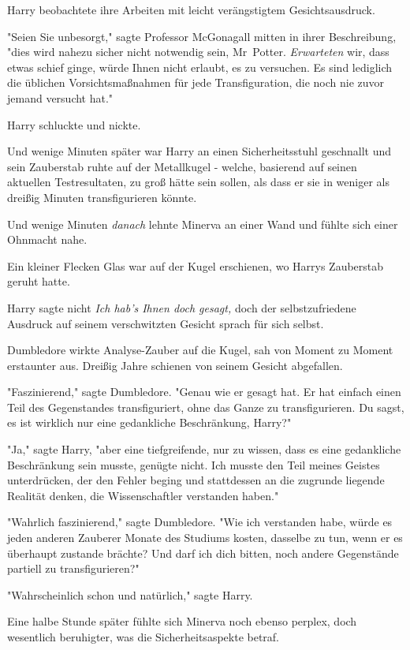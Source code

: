 {Harry beobachtete ihre Arbeiten mit leicht verängstigtem Gesichtsausdruck.

"Seien Sie unbesorgt," sagte Professor McGonagall mitten in ihrer Beschreibung, "dies wird nahezu sicher nicht notwendig sein, Mr~Potter. \emph{Erwarteten} wir, dass etwas schief ginge, würde Ihnen nicht erlaubt, es zu versuchen. Es sind lediglich die üblichen Vorsichtsmaßnahmen für jede Transfiguration, die noch nie zuvor jemand versucht hat."

Harry schluckte und nickte.

Und wenige Minuten später war Harry an einen Sicherheitsstuhl geschnallt und sein Zauberstab ruhte auf der Metallkugel - welche, basierend auf seinen aktuellen Testresultaten, zu groß hätte sein sollen, als dass er sie in weniger als dreißig Minuten transfigurieren könnte.

Und wenige Minuten \emph{danach} lehnte Minerva an einer Wand und fühlte sich einer Ohnmacht nahe.

Ein kleiner Flecken Glas war auf der Kugel erschienen, wo Harrys Zauberstab geruht hatte.

Harry sagte nicht \emph{Ich hab's Ihnen doch gesagt,} doch der selbstzufriedene Ausdruck auf seinem verschwitzten Gesicht sprach für sich selbst.

Dumbledore wirkte Analyse-Zauber auf die Kugel, sah von Moment zu Moment erstaunter aus. Dreißig Jahre schienen von seinem Gesicht abgefallen.

"Faszinierend," sagte Dumbledore. "Genau wie er gesagt hat. Er hat einfach einen Teil des Gegenstandes transfiguriert, ohne das Ganze zu transfigurieren. Du sagst, es ist wirklich nur eine gedankliche Beschränkung, Harry?"

"Ja," sagte Harry, "aber eine tiefgreifende, nur zu wissen, dass es eine gedankliche Beschränkung sein musste, genügte nicht. Ich musste den Teil meines Geistes unterdrücken, der den Fehler beging und stattdessen an die zugrunde liegende Realität denken, die Wissenschaftler verstanden haben."

"Wahrlich faszinierend," sagte Dumbledore. "Wie ich verstanden habe, würde es jeden anderen Zauberer Monate des Studiums kosten, dasselbe zu tun, wenn er es überhaupt zustande brächte? Und darf ich dich bitten, noch andere Gegenstände partiell zu transfigurieren?"

"Wahrscheinlich schon und natürlich," sagte Harry.

Eine halbe Stunde später fühlte sich Minerva noch ebenso perplex, doch wesentlich beruhigter, was die Sicherheitsaspekte betraf.

}
